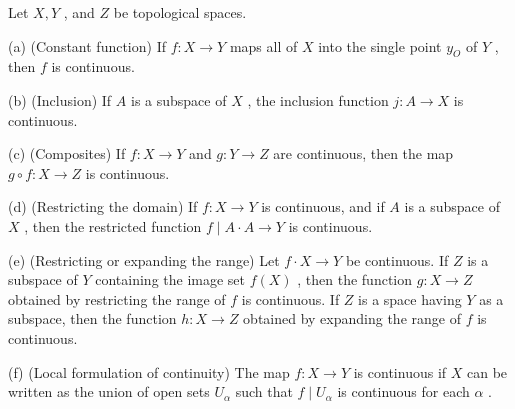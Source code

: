 \begin{theorem} Let \(X,Y\) , and \(Z\) be topological spaces.

(a) (Constant function) If \(f : X \rightarrow  Y\) maps all of \(X\) into the single point \({y}_{O}\) of \(Y\) , then \(f\) is continuous.

(b) (Inclusion) If \(A\) is a subspace of \(X\) , the inclusion function \(j : A \rightarrow  X\) is continuous.

(c) (Composites) If \(f : X \rightarrow  Y\) and \(g : Y \rightarrow  Z\) are continuous, then the map \(g \circ  f : X \rightarrow  Z\) is continuous.

(d) (Restricting the domain) If \(f : X \rightarrow  Y\) is continuous, and if \(A\) is a subspace of \(X\) , then the restricted function \(f \mid  A \cdot  A \rightarrow  Y\) is continuous.

(e) (Restricting or expanding the range) Let \(f \cdot  X \rightarrow  Y\) be continuous. If \(Z\) is a subspace of \(Y\) containing the image set \(f\left( X\right)\) , then the function \(g : X \rightarrow  Z\) obtained by restricting the range of \(f\) is continuous. If \(Z\) is a space having \(Y\) as a subspace, then the function \(h : X \rightarrow  Z\) obtained by expanding the range of \(f\) is continuous.

(f) (Local formulation of continuity) The map \(f : X \rightarrow  Y\) is continuous if \(X\) can be written as the union of open sets \({U}_{\alpha }\) such that \(f \mid  {U}_{\alpha }\) is continuous for each \(\alpha\) .

\end{theorem}
